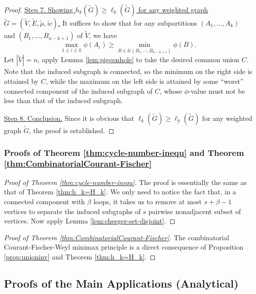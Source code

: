 \documentclass[12pt, reqno]{article}
\begin{document}
\begin{proof}
\vspace{0.3cm}

\noindent\underline{Step 7. Showing $h_k(\tilde G)\ge\ell_k(\tilde G)$ for any weighted graph $\tilde G=(\tilde V,\tilde E,\tilde\mu,\tilde w)$.}
\newline\noindent It suffices to show that for any subpartitions $(A_1,\dots,A_k)$ and $(B_1,\dots,B_{n-k+1})$ of $\tilde V$, we have \[\max_{1\le i\le k}\phi(A_i)\ge\min_{B\in \mathcal{U}(B_1,\cdots,B_{n-k+1})}\phi(B).\] Let $|\tilde V|=n$, apply Lemma \ref{lem:pigeonhole} to take the desired common union $C$. Note that the induced subgraph is connected, so the minimum on the right side is attained by $C$, while the maximum on the left side is attained by some ``worst'' connected component of the induced subgraph of $C$, whose $\phi$-value must not be less than that of the induced subgraph.

\vspace{0.3cm}

\noindent\underline{Step 8. Conclusion.}
\newline\noindent Since it is obvious that $\ell_k(\tilde G)\ge\underline{\ell_k}(\tilde G)$ for any weighted graph $\tilde G$, the proof is established.


\end{proof}

\subsubsection{Proofs of Theorem \ref{thm:cycle-number-inequ} and Theorem \ref{thm:CombinatorialCourant-Fischer}}
\begin{proof}[Proof of Theorem \ref{thm:cycle-number-inequ}]
The proof is essentially the same as that of Theorem \ref{thm:h_k=H_k}. We only need to notice the fact that, in a connected component with $\beta$ loops, it takes us to remove at most $s+\beta-1$ vertices to separate the induced subgraphs of $s$ pairwise nonadjacent subset of vertices. Now apply Lemma \ref{lem:cheeger-set-disjoint}.
\end{proof}

\begin{proof}[Proof of Theorem \ref{thm:CombinatorialCourant-Fischer}]
The combinatorial Courant-Fischer-Weyl minimax principle is a direct consequence of Proposition \ref{prop:unioninv} and Theorem \ref{thm:h_k=H_k}.
\end{proof}

\subsection{Proofs of the Main Applications (Analytical)}
\end{document}
